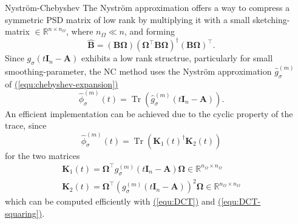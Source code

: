 \documentclass[final, leqno, 12pt]{beamer}
\newcommand{\mtx}[1]{\boldsymbol{#1}}
\DeclareMathOperator{\Tr}{Tr}
\newcommand{\refequ}[1]{\hyperref[#1]{\textcolor{linkcolor}{(\ref*{#1})}}}
\begin{document}
\begin{frame}[t]
\begin{columns}[t]
\begin{column}{0.3\paperwidth}
    \end{column}

    \begin{column}{0.3\paperwidth}

        \begin{block}{Nystr\"om-Chebyshev}
            The Nystr\"om approximation offers a way to compress a symmetric
            \gls{PSD} matrix of low rank by multiplying it with
            a small \gls{sketching-matrix} $\in \mathbb{R}^{n \times n_{\Omega}}$, where
            $n_{\Omega} \ll n$, and forming
            \begin{equation}
                \widehat{\mtx{B}} = (\mtx{B} \mtx{\Omega}) (\mtx{\Omega}^{\top} \mtx{B} \mtx{\Omega})^{\dagger} (\mtx{B} \mtx{\Omega})^{\top}.
            \end{equation}
            Since $g_{\sigma}(t\mtx{I}_n - \mtx{A})$ exhibits a low rank structrue,
            particularly for small \gls{smoothing-parameter}, the \gls{NC}
            method uses the Nystr\"om approximation $\widehat{g}_{\sigma}^{(m)}$ of \refequ{equ:chebyshev-expansion}
            \begin{equation}
                \boxed{\widehat{\phi}_{\sigma}^{(m)}(t) = \Tr(\widehat{g}_{\sigma}^{(m)}(t\mtx{I}_n - \mtx{A})).}
            \end{equation}
            An efficient implementation can be achieved due to the cyclic property
            of the trace, since
            \begin{equation}
                \widehat{\phi}_{\sigma}^{(m)}(t) = \Tr(\mtx{K}_1(t)^{\dagger} \mtx{K}_2(t))
            \end{equation}
            for the two matrices 
            \begin{align}
                \mtx{K}_1(t) = \mtx{\Omega}^{\top} g_{\sigma}^{(m)}(t\mtx{I}_n - \mtx{A}) \mtx{\Omega} \in \mathbb{R}^{n_{\Omega} \times n_{\Omega}} \\
                \mtx{K}_2(t) = \mtx{\Omega}^{\top} (g_{\sigma}^{(m)}(t\mtx{I}_n - \mtx{A}))^2 \mtx{\Omega} \in \mathbb{R}^{n_{\Omega} \times n_{\Omega}}
            \end{align}
            which can be computed efficiently with \refequ{equ:DCT} and \refequ{equ:DCT-squaring}.
        \end{block}

    \end{column}


\end{columns}
\end{frame}
\end{document}
